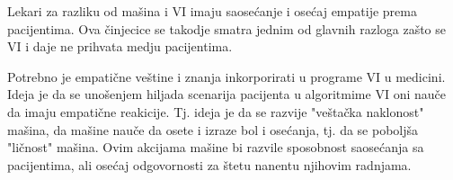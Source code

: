 \documentclass[a4paper]{article}
\begin{document}
Lekari za razliku od mašina i VI imaju saosećanje i osećaj empatije prema pacijentima. Ova činjecice se takodje smatra jednim od glavnih razloga zašto se VI i daje ne prihvata medju pacijentima.

Potrebno je empatične veštine i znanja inkorporirati u programe VI u medicini. Ideja je da se unošenjem hiljada scenarija pacijenta u algoritmime VI oni nauče da imaju empatične reakicije. Tj. ideja je da se razvije "veštačka naklonost" mašina, da mašine nauče da osete i izraze bol i osećanja, tj. da se poboljša "ličnost" mašina. Ovim akcijama mašine bi razvile sposobnost saosećanja sa pacijentima, ali osećaj odgovornosti za štetu nanentu njihovim radnjama.
\end{document}
